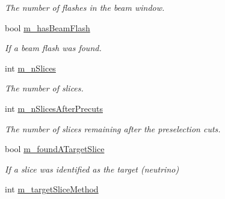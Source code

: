\begin{DoxyCompactItemize}
\begin{DoxyCompactList}\small\item\em The number of flashes in the beam window. \end{DoxyCompactList}\item 
\hypertarget{classflashmatch_1_1FlashMatchingTool_1_1OutputEvent_a9e92162c1cc3f01035790f16a10fa1a3}{bool \hyperlink{classflashmatch_1_1FlashMatchingTool_1_1OutputEvent_a9e92162c1cc3f01035790f16a10fa1a3}{m\-\_\-has\-Beam\-Flash}}\label{classflashmatch_1_1FlashMatchingTool_1_1OutputEvent_a9e92162c1cc3f01035790f16a10fa1a3}

\begin{DoxyCompactList}\small\item\em If a beam flash was found. \end{DoxyCompactList}\item 
\hypertarget{classflashmatch_1_1FlashMatchingTool_1_1OutputEvent_aa7f53bbb1437cf37dd0b309583ab17fd}{int \hyperlink{classflashmatch_1_1FlashMatchingTool_1_1OutputEvent_aa7f53bbb1437cf37dd0b309583ab17fd}{m\-\_\-n\-Slices}}\label{classflashmatch_1_1FlashMatchingTool_1_1OutputEvent_aa7f53bbb1437cf37dd0b309583ab17fd}

\begin{DoxyCompactList}\small\item\em The number of slices. \end{DoxyCompactList}\item 
\hypertarget{classflashmatch_1_1FlashMatchingTool_1_1OutputEvent_a1082644564c236e914d79039d09aa4c6}{int \hyperlink{classflashmatch_1_1FlashMatchingTool_1_1OutputEvent_a1082644564c236e914d79039d09aa4c6}{m\-\_\-n\-Slices\-After\-Precuts}}\label{classflashmatch_1_1FlashMatchingTool_1_1OutputEvent_a1082644564c236e914d79039d09aa4c6}

\begin{DoxyCompactList}\small\item\em The number of slices remaining after the preselection cuts. \end{DoxyCompactList}\item 
\hypertarget{classflashmatch_1_1FlashMatchingTool_1_1OutputEvent_a7f5aaa5a8baaeacce19ffd2e9efdf92f}{bool \hyperlink{classflashmatch_1_1FlashMatchingTool_1_1OutputEvent_a7f5aaa5a8baaeacce19ffd2e9efdf92f}{m\-\_\-found\-A\-Target\-Slice}}\label{classflashmatch_1_1FlashMatchingTool_1_1OutputEvent_a7f5aaa5a8baaeacce19ffd2e9efdf92f}

\begin{DoxyCompactList}\small\item\em If a slice was identified as the target (neutrino) \end{DoxyCompactList}\item 
\hypertarget{classflashmatch_1_1FlashMatchingTool_1_1OutputEvent_a840f143d067c5065ecbf8f7e0397bacf}{int \hyperlink{classflashmatch_1_1FlashMatchingTool_1_1OutputEvent_a840f143d067c5065ecbf8f7e0397bacf}{m\-\_\-target\-Slice\-Method}}\label{classflashmatch_1_1FlashMatchingTool_1_1OutputEvent_a840f143d067c5065ecbf8f7e0397bacf}


\end{DoxyCompactItemize}
